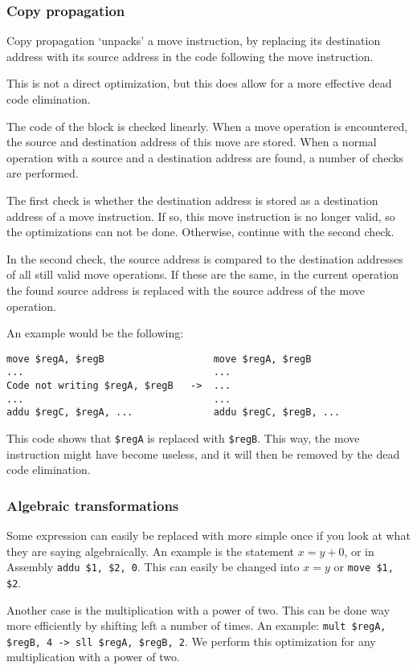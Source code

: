 \documentclass[10pt,a4paper]{article}
\begin{document}
\subsubsection*{Copy propagation}

Copy propagation `unpacks' a move instruction, by replacing its destination
address with its source address in the code following the move instruction.

This is not a direct optimization, but this does allow for a more effective
dead code elimination.

The code of the block is checked linearly. When a move operation is
encountered, the source and destination address of this move are stored. When
a normal operation with a source and a destination address are found, a number
of checks are performed.

The first check is whether the destination address is stored as a destination
address of a move instruction. If so, this move instruction is no longer valid,
so the optimizations can not be done. Otherwise, continue with the second
check.

In the second check, the source address is compared to the destination
addresses of all still valid move operations. If these are the same, in the
current operation the found source address is replaced with the source address
of the move operation.

An example would be the following:
\begin{verbatim}
move $regA, $regB                   move $regA, $regB
...                                 ...
Code not writing $regA, $regB   ->  ...
...                                 ...
addu $regC, $regA, ...              addu $regC, $regB, ...
\end{verbatim}
This code shows that \texttt{\$regA} is replaced with \texttt{\$regB}. This
way, the move instruction might have become useless, and it will then be
removed by the dead code elimination.

\subsubsection*{Algebraic transformations}

Some expression can easily be replaced with more simple once if you look at
what they are saying algebraically. An example is the statement $x = y + 0$, or
in Assembly \texttt{addu \$1, \$2, 0}. This can easily be changed into $x = y$
or \texttt{move \$1, \$2}.

Another case is the multiplication with a power of two. This can be done way
more efficiently by shifting left a number of times. An example:
\texttt{mult \$regA, \$regB, 4    ->  sll  \$regA, \$regB, 2}. We perform this
optimization for any multiplication with a power of two.
\end{document}
